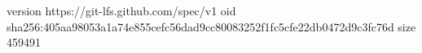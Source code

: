 version https://git-lfs.github.com/spec/v1
oid sha256:405aa98053a1a74e855cefc56dad9cc80083252f1fc5cfe22db0472d9c3fc76d
size 459491

